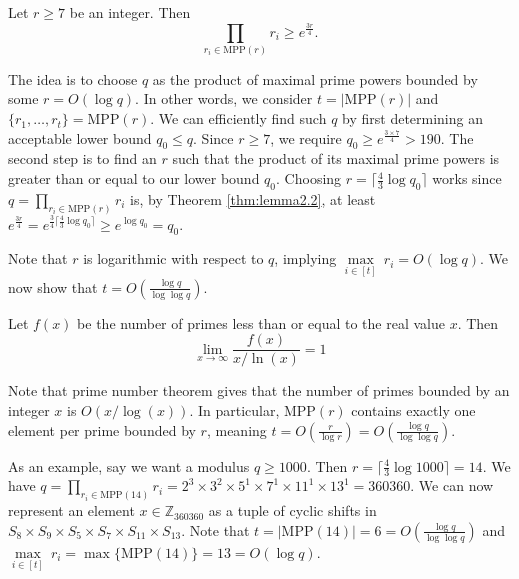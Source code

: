 \begin{theorem}\label{thm:lemma2.2}
    Let $r \geq 7$ be an integer. Then
    \begin{equation*}
        \underset{r_i \in \text{MPP}(r)}{\prod} r_i \geq e^{\frac{3r}{4}}.
    \end{equation*}
\end{theorem}

The idea is to choose $q$ as the product of maximal prime powers bounded by some $r = O(\log q)$. In other words, we consider $t = |\text{MPP}(r)|$ and $\{r_1, \dots, r_t\} = \text{MPP}(r)$. We can efficiently find such $q$ by first determining an acceptable lower bound $q_0 \leq q$. Since $r \geq 7$, we require $q_0 \geq e^{\frac{3 \times 7}{4}} > 190$. The second step is to find an $r$ such that the product of its maximal prime powers is greater than or equal to our lower bound $q_0$. Choosing $r = \lceil \frac{4}{3} \log q_0 \rceil$ works since $q = \underset{r_i \in \text{MPP}(r)}{\prod} r_i$ is, by Theorem \ref{thm:lemma2.2}, at least $e^{\frac{3r}{4}} = e^{\frac{3}{4} \lceil \frac{4}{3} \log q_0 \rceil} \geq e^{\log q_0} = q_0$.

Note that $r$ is logarithmic with respect to $q$, implying $\underset{i \in [t]}{\max} \ r_i = O(\log q)$.
We now show that $t = O(\frac{\log q}{\log \log q})$.

\begin{theorem}
    Let $f(x)$ be the number of primes less than or equal to the real value $x$. Then
    \begin{equation*}
        \lim_{x \to \infty} \frac{f(x)}{x/\ln(x)} = 1
    \end{equation*}
\end{theorem}
Note that prime number theorem gives that the number of primes bounded by an integer $x$ is $O(x/\log(x))$. In particular, $\text{MPP}(r)$ contains exactly one element per prime bounded by $r$, meaning $t = O(\frac{r}{\log r}) = O(\frac{\log q}{\log \log q})$.

As an example, say we want a modulus $q \geq 1000$. Then $r = \lceil \frac{4}{3} \log 1000 \rceil = 14$. We have $q = \underset{r_i \in \text{MPP}(14)}{\prod} r_i = 2^3 \times 3^2 \times 5^1 \times 7^1 \times 11^1 \times 13^1 = 360360$. We can now represent an element $x \in \mathbb{Z}_{360360}$ as a tuple of cyclic shifts in $S_8 \times S_9 \times S_5 \times S_7 \times S_{11} \times S_{13}$. Note that $t = |\text{MPP}(14)| = 6 = O(\frac{\log q}{\log \log q})$ and $\underset{i \in [t]}{\max} \ r_i = \max\{\text{MPP}(14)\} = 13 = O(\log q)$.